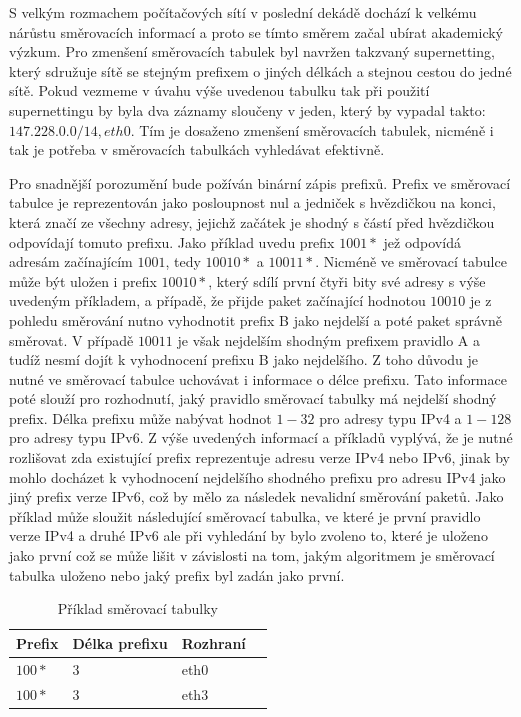 S velkým rozmachem počítačových sítí v poslední dekádě
dochází k velkému nárůstu směrovacích informací a proto se tímto směrem začal ubírat akademický výzkum.
Pro zmenšení směrovacích tabulek byl navržen takzvaný supernetting, který sdružuje sítě se stejným
prefixem o jiných délkách a stejnou cestou do jedné sítě.
Pokud vezmeme v úvahu výše uvedenou tabulku tak při použití supernettingu by byla dva záznamy sloučeny
v jeden, který by vypadal takto: $147.228.0.0/14, eth0$.
Tím je dosaženo zmenšení směrovacích tabulek,
nicméně i tak je potřeba v směrovacích tabulkách vyhledávat efektivně.

Pro snadnější porozumění bude požíván binární zápis prefixů.
Prefix ve směrovací tabulce je reprezentován jako posloupnost nul a jedniček s hvězdičkou na konci,
která značí ze všechny adresy, jejichž začátek je shodný s částí před hvězdičkou odpovídají tomuto prefixu.
Jako příklad uvedu prefix $1001*$ jež odpovídá adresám začínajícím $1001$, tedy $10010*$ a $10011*$.
Nicméně ve směrovací tabulce může být uložen i prefix $10010*$, který sdílí první čtyři bity své adresy
s výše uvedeným příkladem, a případě, že přijde paket začínající hodnotou $10010$ je z pohledu směrování
nutno vyhodnotit prefix B jako nejdelší a poté paket správně směrovat. V případě $10011$ je však nejdelším
shodným prefixem pravidlo A a tudíž nesmí dojít k vyhodnocení prefixu B jako nejdelšího.
Z toho důvodu je nutné ve směrovací tabulce uchovávat i informace o délce prefixu.
Tato informace poté slouží pro rozhodnutí, jaký pravidlo směrovací tabulky má nejdelší shodný prefix.
Délka prefixu může nabývat hodnot $1-32$ pro adresy typu
IPv4 a $1-128$ pro adresy typu IPv6. Z výše uvedených informací a příkladů vyplývá,
že je nutné rozlišovat zda existující prefix reprezentuje adresu verze IPv4 nebo IPv6,
jinak by mohlo docházet k vyhodnocení nejdelšího shodného prefixu pro adresu IPv4
jako jiný prefix verze IPv6, což by mělo za následek nevalidní směrování paketů.
Jako příklad může sloužit následující směrovací tabulka, ve které je první pravidlo
verze IPv4 a druhé IPv6 ale při vyhledání by bylo zvoleno to, které je uloženo jako
první což se může lišit v závislosti na tom, jakým algoritmem je směrovací tabulka
uloženo nebo jaký prefix byl zadán jako první.

\begin{table}[!htbp]
	\center
    \begin{tabular}{|l|l|l|l|}
    \hline
    Prefix & Délka prefixu & Rozhraní \\ \hline
    $100*$ & 3 & eth0 \\ \hline
    $100*$ & 3 & eth3 \\ \hline
    \end{tabular}
    \caption{Příklad směrovací tabulky}
\end{table}


